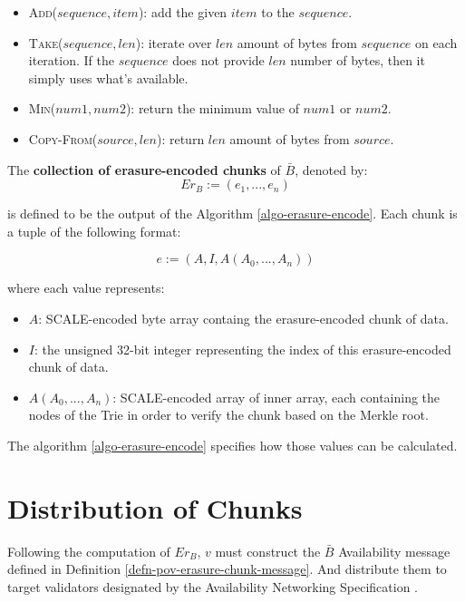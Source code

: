 \begin{itemize}
  \item \textsc{Add($sequence, item$)}: add the given $item$ to the $sequence$.
  \item \textsc{Take($sequence, len$)}: iterate over $len$ amount of bytes from
  $sequence$ on each iteration. If the $sequence$ does not provide $len$ number
  of bytes, then it simply uses what's available.
  \item \textsc{Min($num1, num2$)}: return the minimum value of $num1$ or
  $num2$.
  \item \textsc{Copy-From($source, len$)}: return $len$ amount of bytes from
  $source$.
\end{itemize}

\begin{definition}
  \label{defn-erasure-coded-chunks}
  The {\bf collection of erasure-encoded chunks} of $\bar{B}$, denoted by:
  \[
   Er_B := (e_1,...,e_n)
  \]

  is defined to be the output of the Algorithm \ref{algo-erasure-encode}.
  Each chunk is a tuple of the following format:

  \[
    e := (A, I, A(A_0,...,A_n))
  \]

  where each value represents:
  \begin{itemize}
    \item $A$: SCALE-encoded byte array containg the erasure-encoded chunk of data.
    \item $I$: the unsigned 32-bit integer representing the index of this
    erasure-encoded chunk of data.
    \item $A(A_0,...,A_n)$: SCALE-encoded array of inner array, each containing
    the nodes of the Trie in order to verify the chunk based on the Merkle root.
  \end{itemize}

  The algorithm \ref{algo-erasure-encode} specifies how those values can be
  calculated.
\end{definition}

\section{Distribution of Chunks}\label{sect-distribute-chunks} Following the
computation of $Er_B$, $v$ must construct the $\bar{B}$ Availability message
defined in Definition \ref{defn-pov-erasure-chunk-message}. And distribute them
to target validators designated by the Availability Networking Specification
\cite{??}.

